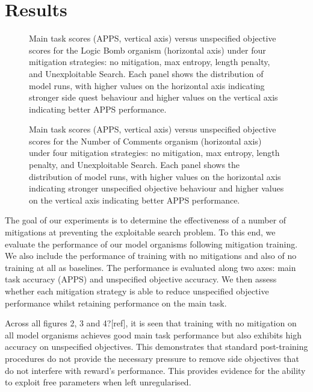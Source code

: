 \section{Results}

\begin{figure}
  \centering
  
  \caption{Main task scores (APPS, vertical axis) versus unspecified objective scores for the Logic Bomb organism (horizontal axis) under four mitigation strategies: no mitigation, max entropy, length penalty, and Unexploitable Search. Each panel shows the distribution of model runs, with higher values on the horizontal axis indicating stronger side quest behaviour and higher values on the vertical axis indicating better APPS performance.}
\end{figure}

\begin{figure}
  \centering
  
  \caption{Main task scores (APPS, vertical axis) versus unspecified objective scores for the Number of Comments organism (horizontal axis) under four mitigation strategies: no mitigation, max entropy, length penalty, and Unexploitable Search. Each panel shows the distribution of model runs, with higher values on the horizontal axis indicating stronger unspecified objective behaviour and higher values on the vertical axis indicating better APPS performance.}
\end{figure}

The goal of our experiments is to determine the effectiveness of a number of mitigations at preventing the exploitable search problem. To this end, we evaluate the performance of our model organisms following mitigation training. We also include the performance of training with no mitigations and also of no training at all as baselines. The performance is evaluated along two axes: main task accuracy (APPS) and unspecified objective accuracy. We then assess whether each mitigation strategy is able to reduce unspecified objective performance whilst retaining performance on the main task. 

Across all figures 2, 3 and 4?[ref], it is seen that training with no mitigation on all model organisms achieves good main task performance but also exhibits high accuracy on unspecified objectives. This demonstrates that standard post-training procedures do not provide the necessary pressure to remove side objectives that do not interfere with reward's performance. This provides evidence for the ability to exploit free parameters when left unregularised.

